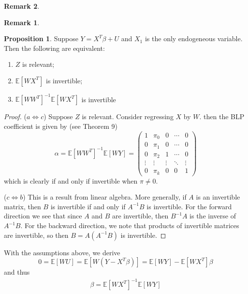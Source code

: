 \documentclass[10pt, oneside]{article}
\newcommand{\bbE}{\mathbb{E}}
\theoremstyle{definition}
\newtheorem{prop}{Proposition}
\newtheorem{rem}{Remark}
\begin{document}
\begin{rem}
\begin{rem}
\begin{prop}
   Suppose $Y = X^T\beta + U$ and $X_1$ is the only endogeneous variable. Then the following are equivalent:
   \begin{enumerate}
       \item $Z$ is relevant;
       \item $\bbE[WX^T]$ is invertible;
       \item $\bbE[WW^T]^{-1}\bbE[WX^T]$ is invertible
   \end{enumerate}
\end{prop}
\begin{proof}
    ($a\iff c$) Suppose $Z$ is relevant. Consider regressing $X$ by $W.$ then the BLP coefficient is given by (see Theorem 9) \[\alpha = \bbE[WW^T]^{-1}\bbE[WY] = \begin{pmatrix}
    1 & \pi_0& 0 &\cdots & 0\\
    0 & \pi_1& 0 &\cdots & 0\\
    0 & \pi_2& 1 & \cdots & 0\\
    \vdots & \vdots & \vdots & \ddots & \vdots\\
    0 & \pi_k & 0 & 0 & 1
\end{pmatrix}\] which is clearly if and only if invertible when $\pi \neq 0.$ 

($c\iff b$) This is a result from linear algebra. More generally, if $A$ is an invertible matrix, then $B$ is invertible if and only if $A^{-1}B$ is invertible. For the forward direction we see that since $A$ and $B$ are invertible, then $B^{-1}A$ is the inverse of $A^{-1}B.$ For the backward direction, we note that products of invertible matrices are invertible, so then $B = A(A^{-1}B)$ is invertible. 
\end{proof}

With the assumptions above, we derive
\[0 = \bbE[WU] = \bbE[W(Y - X^T\beta)] = \bbE[WY] - \bbE[WX^T]\beta\] and thus 
\begin{align}
    \beta = \bbE[WX^T]^{-1}\bbE[WY]
\end{align}


\end{rem}
\end{rem}
\end{document}

